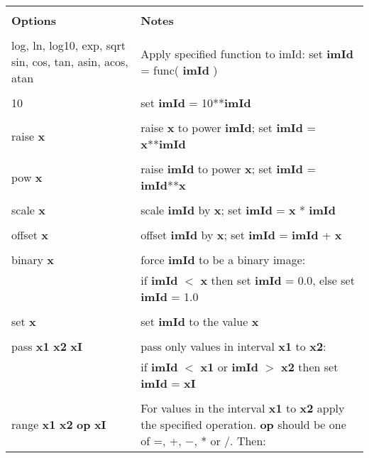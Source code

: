 \begin{table}
\begin{tabular}{|l||l|}
\hline
& \\
{\bf Options} & {\bf Notes} \\
& \\ \hline
\begin{minipage}[t]{4.0cm}
log, ln, log10, exp, sqrt
sin, cos, tan, asin, acos, atan 
\end{minipage} &
\begin{minipage}[t]{11.0cm}
Apply specified function to imId:
\newline
set {\bf imId} = func( {\bf imId} )
\end{minipage} \\
& \\
10 & set {\bf imId} = 10**{\bf imId} \\
& \\
raise {\bf x} & raise {\bf x} to power {\bf imId}; 
set {\bf imId} = {\bf x}**{\bf imId} \\
& \\
pow {\bf x} & raise {\bf imId} to power {\bf x}; set {\bf imId} = {\bf imId}**{\bf x}\\
& \\
scale {\bf x} & scale {\bf imId} by {\bf x}; set {\bf imId} = {\bf x} * {\bf imId}\\
& \\
offset {\bf x} & offset {\bf imId} by {\bf x}; set {\bf imId} = {\bf imId} + {\bf x}\\
& \\
binary {\bf x} & force {\bf imId} to be a binary image:\\
& if {\bf imId} $<$ {\bf x} then set {\bf imId} = 0.0, else set {\bf imId} = 1.0 \\
& \\
set {\bf x} & set {\bf imId} to the value {\bf x} \\
& \\
pass {\bf x1} {\bf x2} {\bf xI} & pass only values in interval {\bf x1} to {\bf x2}:\\
& if  {\bf imId} $<$ {\bf x1} or {\bf imId} $>$ {\bf x2} then set {\bf imId} = {\bf xI} \\
& \\
range {\bf x1} {\bf x2} {\bf op} {\bf xI} &
\begin{minipage}[t]{11.0cm}
For values in the interval {\bf x1} to {\bf x2} apply the specified operation.
{\bf op} should be one of =, +, $-$, * or /. Then:
\newline

\end{minipage}
\end{tabular}
\end{table}
